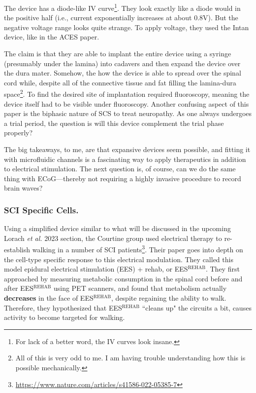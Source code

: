 \documentclass[12pt]{report}
\begin{document}
The device has a diode-like IV curve\footnote{For lack of a better word, the IV curves look insane.}. They look exactly like a diode would in the positive half (i.e., current exponentially increases at about 0.8V). But the negative voltage range looks quite strange. To apply voltage, they used the Intan device, like in the ACES paper.\newline

The claim is that they are able to implant the entire device using a syringe (presumably under the lamina) into cadavers and then expand the device over the dura mater. Somehow, the how the device is able to spread over the spinal cord while, despite all of the connective tissue and fat filling the lamina-dura space\footnote{All of this is very odd to me. I am having trouble understanding how this is possible mechanically.}. To find the desired site of implantation required fluoroscopy, meaning the device itself had to be visible under fluoroscopy. Another confusing aspect of this paper is the biphasic nature of SCS to treat neuropathy. As one always undergoes a trial period, the question is will this device complement the trial phase properly?\newline

The big takeaways, to me, are that expansive devices seem possible, and fitting it with microfluidic channels is a fascinating way to apply therapeutics in addition to electrical stimulation. The next question is, of course, can we do the same thing with ECoG---thereby not requiring a highly invasive procedure to record brain waves? 

\subsubsection{SCI Specific Cells.}

Using a simplified device similar to what will be discussed in the upcoming Lorach \textit{et al.} 2023 section, the Courtine group used electrical therapy to re-establish walking in a number of SCI patients\footnote{\url{https://www.nature.com/articles/s41586-022-05385-7}}. Their paper goes into depth on the cell-type specific response to this electrical modulation. They called this model epidural electrical stimulation (EES) + rehab, or EES$^{\mathrm{REHAB}}$. They first approached by measuring metabolic consumption in the spinal cord before and after EES$^{\mathrm{REHAB}}$ using PET scanners, and found that metabolism actually \textbf{decreases} in the face of EES$^{\mathrm{REHAB}}$, despite regaining the ability to walk. Therefore, they hypothesized that EES$^{\mathrm{REHAB}}$ ``cleans up" the circuits a bit, causes activity to become targeted for walking.\newline
\end{document}
